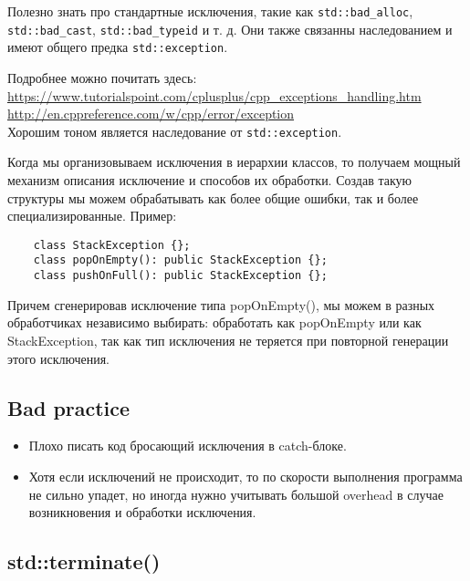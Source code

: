 Полезно знать про стандартные исключения, такие как  \texttt{std::bad_alloc}, \texttt{std::bad_cast}, \texttt{std::bad_typeid} и т. д. Они также связанны наследованием и имеют общего предка \texttt{std::exception}.

Подробнее можно почитать здесь: \\
\url{https://www.tutorialspoint.com/cplusplus/cpp_exceptions_handling.htm} \\
\url{http://en.cppreference.com/w/cpp/error/exception} \\

Хорошим тоном является наследование от \texttt{std::exception}.

Когда мы организовываем исключения в иерархии классов, то получаем мощный механизм описания исключение и способов их обработки. Создав такую структуры мы можем обрабатывать как более общие ошибки, так и более специализированные.
Пример:
\begin{verbatim}
    class StackException {};
    class popOnEmpty(): public StackException {};
    class pushOnFull(): public StackException {};
\end{verbatim}
	Причем сгенерировав исключение типа popOnEmpty(), мы можем в разных обработчиках независимо выбирать: обработать как popOnEmpty или как StackException, так как тип исключения не теряется при повторной генерации этого исключения.

\subsection{Bad practice}
\begin{itemize}
\item
Плохо писать код бросающий исключения в catch-блоке.
\item
Хотя если исключений не происходит, то по скорости выполнения программа не сильно упадет, но иногда нужно учитывать большой overhead в случае возникновения и обработки исключения.
\end{itemize}

\subsection{std::terminate()}

